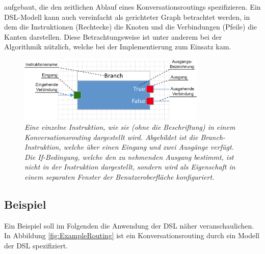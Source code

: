 aufgebaut, die den zeitlichen Ablauf eines Konversationsroutings spezifizieren. Ein DSL-Modell kann auch vereinfacht als gerichteter Graph betrachtet werden, in dem die Instruktionen (Rechtecke) die Knoten und die Verbindungen (Pfeile) die Kanten darstellen. Diese Betrachtungsweise ist unter anderem bei der Algorithmik nützlich, welche bei der Implementierung zum Einsatz kam.
\begin{figure} %
	\centering
		\includegraphics[width=0.8\textwidth]{img/SingleNodeWithAnnotations.png}
	\caption[Beschriftung einer DSL-Instruktion]{\textit{Eine einzelne Instruktion, wie sie (ohne die Beschriftung) in einem Konversationsrouting dargestellt wird. Abgebildet ist die Branch-Instruktion, welche über einen Eingang und zwei Ausgänge verfügt. Die If-Bedingung, welche den zu nehmenden Ausgang bestimmt, ist nicht in der Instruktion dargestellt, sondern wird als Eigenschaft in einem separaten Fenster der Benutzeroberfläche konfiguriert.}}
	\label{fig:SingleNode}
\end{figure}

\subsection{Beispiel}
Ein Beispiel soll im Folgenden die Anwendung der DSL näher veranschaulichen. In Abbildung \ref{fig:ExampleRouting} ist ein Konversationsrouting durch ein Modell der DSL spezifiziert. 

